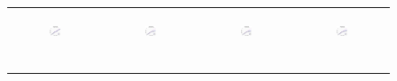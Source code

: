\begin{figure}[ht]
\begin{tabular}{cccc}
	  \begin{subfigure}[b]{0.22\textwidth}
	  	\includegraphics[width=105pt]{images/speedup_friendster10M_setcover.pdf}
			\caption{}
			\label{appfig:speedup_friendster10M_setcover}
	  \end{subfigure} &
	  \begin{subfigure}[b]{0.22\textwidth}
	  	\includegraphics[width=105pt]{images/speedup_arabic2005_setcover.pdf}
			\caption{}
			\label{appfig:speedup_arabic2005_setcover}
	  \end{subfigure} &
	  \begin{subfigure}[b]{0.22\textwidth}
	  	\includegraphics[width=105pt]{images/speedup_uk2005_setcover.pdf}
			\caption{}
			\label{appfig:speedup_uk2005_setcover}
	  \end{subfigure} &
	  \begin{subfigure}[b]{0.22\textwidth}
	  	\includegraphics[width=105pt]{images/speedup_it2004_setcover.pdf}
			\caption{}
			\label{appfig:speedup_it2004_setcover}
	  \end{subfigure} \\
	  \begin{subfigure}[b]{0.22\textwidth}

\end{subfigure}
\end{tabular}
\end{figure}
